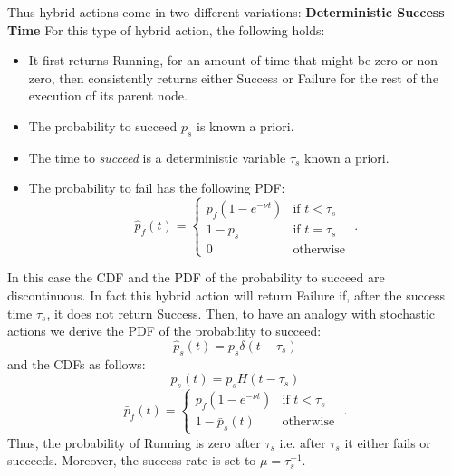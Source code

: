 Thus  hybrid actions come in two different variations:
\textbf{Deterministic Success Time}
For this type of hybrid action, the following holds:    
\begin{itemize}
\item
It first returns Running, for an amount of time that might be zero or non-zero, then consistently returns either Success or Failure for the rest of the execution of its parent node.
\item The probability to succeed $ p_s$ is known a priori.
\item The time to \emph{succeed} is a deterministic variable $\tau_s$ known a priori.
\item The probability to fail has the following PDF:
\begin{equation}
\hat p_f(t)=\begin{cases} p_f (1- e^{-\nu t}) &\mbox{if } t < \tau_s \\ 
1-p_s &\mbox{if } t = \tau_s \\
0 & \mbox{otherwise } 
 \end{cases}.
\end{equation}

\end{itemize}
In this case the CDF and the PDF of the probability to succeed are discontinuous. In fact this hybrid action will return Failure if, after the success time $\tau_s$, it does not return Success.
Then, to have an analogy with stochastic actions we derive the PDF of the probability to succeed:
\begin{equation}
\hat p_s(t) = p_s  \delta(t-\tau_s)  
\end{equation}
and the CDFs as follows:
\begin{equation}
\bar p_s(t) = p_s  H(t-\tau_s)  
\end{equation}
\begin{equation}
\bar p_f(t)=\begin{cases} p_f (1- e^{-\nu t}) &\mbox{if } t < \tau_s \\ 
1 - \bar p_s(t)& \mbox{otherwise }  \end{cases}.
\end{equation}
Thus, the probability of Running is zero after $\tau_s$ i.e. after $\tau_s$ it either fails or succeeds.
Moreover, the success rate is set to $\mu=\tau_s^{-1}$.

